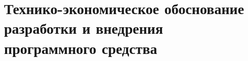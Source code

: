 \section{Технико-экономическое обоснование разработки и внедрения программного средства}
\label{sec:economics}






